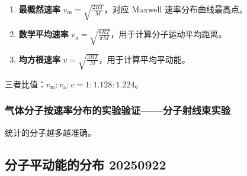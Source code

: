 \begin{enumerate}
    \item \textbf{最概然速率} $v_{\mathrm{m}} = \sqrt{\frac{2RT}{M}}$，对应 Maxwell 速率分布曲线最高点。
    \item \textbf{数学平均速率} $v_{\mathrm{a}} = \sqrt{\frac{8RT}{\pi M}}$，用于计算分子运动平均距离。
    \item \textbf{均方根速率} $v = \sqrt{\frac{3RT}{M}}$，用于计算平均平动能。
\end{enumerate}
三者比值：$v_{\mathrm{m}} : v_{\mathrm{a}} : v = 1 : 1.128 : 1.224$。

\subsubsection{气体分子按速率分布的实验验证——分子射线束实验}

统计的分子越多越准确。

\subsection{分子平动能的分布 20250922}

